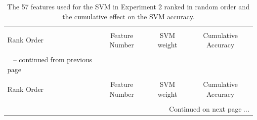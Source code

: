 \documentclass[12pt]{article}
\begin{document}
\begin{longtable}[!htbp]{lccc}
\caption{The 57 features used for the SVM in Experiment 2 ranked in random order and the cumulative effect on the SVM accuracy.} \\
[-1.8ex]\hline \hline \\[-1.8ex] 
{Rank Order} & {Feature Number} & {SVM weight} & {Cumulative Accuracy} \\
\hline \\[-1.8ex]
\endfirsthead

{\tablename\ \thetable{} -- continued from previous page} \\
[1.8ex]\hline \hline \\[-1.8ex] 
{Rank Order} & {Feature Number} & {SVM weight} & {Cumulative Accuracy} \\
\hline \\[-1.8ex]
\endhead

\multicolumn{4}{r}{{Continued on next page ...}} 
\endfoot

\hline 
\endlastfoot


\end{longtable}
\end{document}
